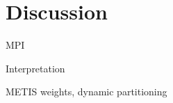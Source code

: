\section{Discussion}
\label{sec:discussion}
MPI

Interpretation

METIS weights, dynamic partitioning